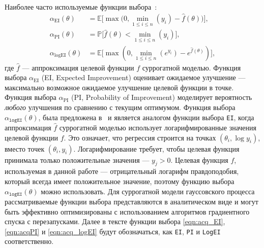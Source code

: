 Наиболее часто используемые функции выбора~\cite{rasmussen2006}:
\begin{align}
    \label{eqn:acq_EI}
    \alpha_{\mathrm{EI}}(\theta) &= \mathbb{E}\bigl[\max\bigl(0, \min_{1 \leq i \leq n}(y_i) - \hat{f}(\theta)\bigr)\bigr],
    \\
    \label{eqn:acqPI}
    \alpha_{\mathrm{PI}}(\theta) &= \mathbb{P}\bigl[\hat{f}(\theta) < \min_{1 \leq i \leq n}(y_i)\bigr],
    \\
    \label{eqn:acq_logEI}
    \alpha_{\mathrm{logEI}}(\theta) &= \mathbb{E}\bigl[\max(0, \min_{1 \leq i \leq n}(e^{y_i}) - e^{\hat{f}(\theta)})\bigr],
\end{align}
где $\hat{f}$ --- аппроксимация целевой функции $f$ суррогатной моделью.
Функция выбора $\alpha_{\mathrm{EI}}$ (EI, Expected Improvement) оценивает ожидаемое улучшение --- максимально возможное ожидаемое улучшение целевой функции в точке.
Функция выбора $\alpha_{\mathrm{PI}}$ (PI, Probability of Improvement) моделирует вероятность \emph{любого} улучшения по сравнению с текущим оптимумом.
Функция выбора $\alpha_{\texttt{logEI}}(\theta)$, была предложена в~\cite{hutter2009experimental} и является аналогом функции выбора \texttt{EI}, когда аппроксимация $\hat{f}$ суррогатной моделью использует логарифмированные значения целевой функции $f$.
Это означает, что регрессия строится на точках $(\theta_i, \log y_i)$, вместо точек $(\theta_i, y_i)$.
Логарифмирование требует, чтобы целевая функция принимала только положительные значения --- $y_j > 0$.
Целевая функция $f$, используемая в данной работе --- отрицательный логарифм правдоподобия, который всегда имеет положительное значение, поэтому функцию выбора $\alpha_{\texttt{logEI}}(\theta)$ можно использовать.
Для суррогатной модели гауссовского процесса рассматриваемые функции выбора представляются в аналитическом виде и могут быть эффективно оптимизированы с использованием алгоритмов градиентного спуска с перезапусками.
Далее в тексте функции выбора \eqref{eqn:acq_EI}, \eqref{eqn:acqPI} и \eqref{eqn:acq_logEI} будут обозначаться, как \texttt{EI}, \texttt{PI} и \texttt{LogEI} соответственно.

